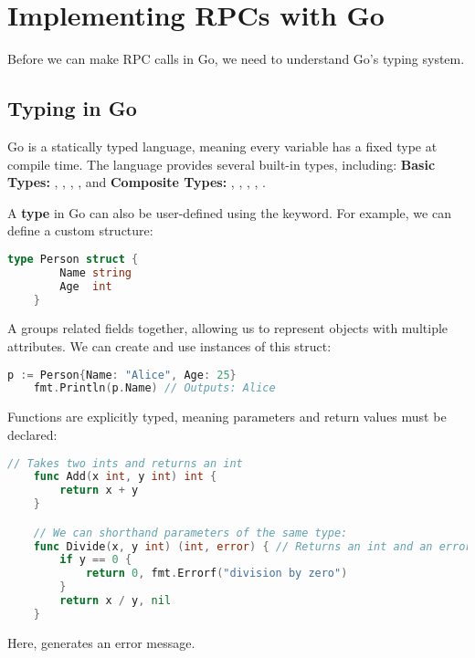 \newpage 
\section{Implementing RPCs with Go}
Before we can make RPC calls in Go, we need to understand Go's typing system.
\subsection{Typing in Go}

\begin{Def}[Typing in Go]

    Go is a statically typed language, meaning every variable has a fixed type at compile time. The language provides several built-in types, including:
\textbf{Basic Types:} , , , , and \textbf{Composite Types:} , , , , .
    
    A \textbf{type} in Go can also be user-defined using the  keyword. For example, we can define a custom structure:
    
    \begin{lstlisting}[language=Go, numbers=none]
    type Person struct {
        Name string
        Age  int
    }
    \end{lstlisting}
    
    A  groups related fields together, allowing us to represent objects with multiple attributes. We can create and use instances of this struct:
    
    \begin{lstlisting}[language=Go, numbers=none]
    p := Person{Name: "Alice", Age: 25}
    fmt.Println(p.Name) // Outputs: Alice
    \end{lstlisting}
   
\end{Def}
    
\begin{Def}

    Functions are explicitly typed, meaning parameters and return values must be declared:
    
    \begin{lstlisting}[language=Go, numbers=none]
    // Takes two ints and returns an int
    func Add(x int, y int) int { 
        return x + y
    }

    // We can shorthand parameters of the same type:
    func Divide(x, y int) (int, error) { // Returns an int and an error
        if y == 0 {
            return 0, fmt.Errorf("division by zero")
        }
        return x / y, nil
    }
    \end{lstlisting}
    
    \noindent
    Here,  generates an error message.
    
\end{Def}
    
